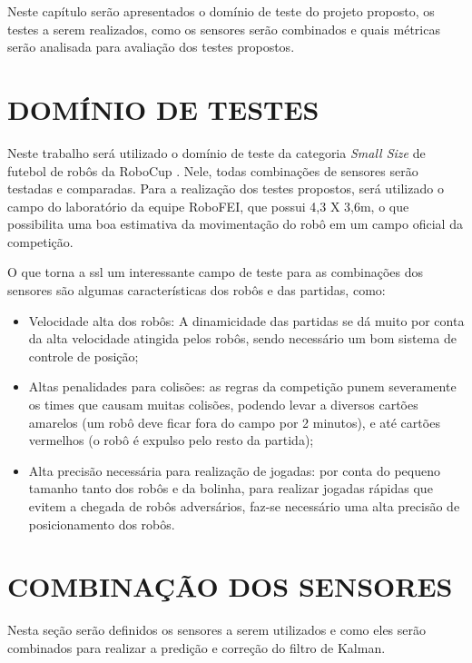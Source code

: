 \documentclass[acronym, symbols]{fei}
\begin{document}
	Neste capítulo serão apresentados o domínio de teste do projeto proposto, os testes a serem realizados, como os sensores serão combinados e quais métricas serão analisada para avaliação dos testes propostos.
	
	\section{DOMÍNIO DE TESTES}
	
		Neste trabalho será utilizado o domínio de teste da categoria \textit{Small Size} de futebol de robôs da RoboCup \cite{RoboCup}. Nele, todas combinações de sensores serão testadas e comparadas. Para a realização dos testes propostos, será utilizado o campo do laboratório da equipe RoboFEI, que possui 4,3 X 3,6m, o que possibilita uma boa estimativa da movimentação do robô em um campo oficial da competição.
		
		O que torna a \acrshort{ssl} um interessante campo de teste para as combinações dos sensores são algumas características dos robôs e das partidas, como:
		
		\begin{itemize}
			\item Velocidade alta dos robôs: A dinamicidade das partidas se dá muito por conta da alta velocidade atingida pelos robôs, sendo necessário um bom sistema de controle de posição;
			
			\item Altas penalidades para colisões: as regras da competição punem severamente os times que causam muitas colisões, podendo levar a diversos cartões amarelos (um robô deve ficar fora do campo por 2 minutos), e até cartões vermelhos (o robô é expulso pelo resto da partida);
			
			\item Alta precisão necessária para realização de jogadas: por conta do pequeno tamanho tanto dos robôs e da bolinha, para realizar jogadas rápidas que evitem a chegada de robôs adversários, faz-se necessário uma alta precisão de posicionamento dos robôs.
		\end{itemize}
		
	\section{COMBINAÇÃO DOS SENSORES}
	
		Nesta seção serão definidos os sensores a serem utilizados e como eles serão combinados para realizar a predição e correção do filtro de Kalman.
		
\end{document}
